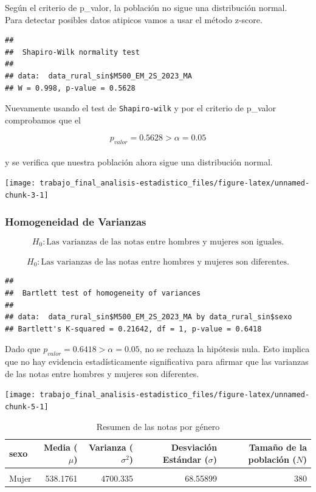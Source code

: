 \documentclass[
]{article}
\begin{document}
Según el criterio de p\_valor, la población no sigue una distribución
normal.\\
Para detectar posibles datos atipicos vamos a usar el método z-score.

\begin{verbatim}
## 
##  Shapiro-Wilk normality test
## 
## data:  data_rural_sin$M500_EM_2S_2023_MA
## W = 0.998, p-value = 0.5628
\end{verbatim}

Nuevamente usando el test de \texttt{Shapiro-wilk} y por el criterio de
p\_valor comprobamos que el

\[p_{valor}=0.5628>\alpha=0.05\]\\
y se verifica que nuestra población ahora sigue una distribución normal.

\begin{center}\texttt{[image: trabajo\_final\_analisis-estadistico\_files/figure-latex/unnamed-chunk-3-1]} \end{center}

\subsubsection*{Homogeneidad de
Varianzas}\label{homogeneidad-de-varianzas}

\[H_{0}: \text{Las varianzas de las notas entre hombres y mujeres son iguales.}\]\\
\[H_{0}: \text{Las varianzas de las notas entre hombres y mujeres son diferentes.}\]

\begin{verbatim}
## 
##  Bartlett test of homogeneity of variances
## 
## data:  data_rural_sin$M500_EM_2S_2023_MA by data_rural_sin$sexo
## Bartlett's K-squared = 0.21642, df = 1, p-value = 0.6418
\end{verbatim}

Dado que \(p_{valor}=0.6418>\alpha=0.05\), no se rechaza la hipótesis
nula. Esto implica que no hay evidencia estadísticamente significativa
para afirmar que las varianzas de las notas entre hombres y mujeres son
diferentes.

\begin{center}\texttt{[image: trabajo\_final\_analisis-estadistico\_files/figure-latex/unnamed-chunk-5-1]} \end{center}

\begin{table}[!h]
\centering
\caption{\label{tab:Estadisticas genero}Resumen de las notas por género}
\centering
\begin{tabular}[t]{lrrrr}
\toprule
sexo & Media (\(\mu\)) & Varianza (\(\sigma^{2}\)) & Desviación Estándar (\(\sigma\)) & Tamaño de la población (\(N\))\\
\midrule
\cellcolor{gray!10}{Hombre} & \cellcolor{gray!10}{549.3282} & \cellcolor{gray!10}{4936.985} & \cellcolor{gray!10}{70.26368} & \cellcolor{gray!10}{342}\\
Mujer & 538.1761 & 4700.335 & 68.55899 & 380\\
\bottomrule
\end{tabular}
\end{table}
\end{document}

